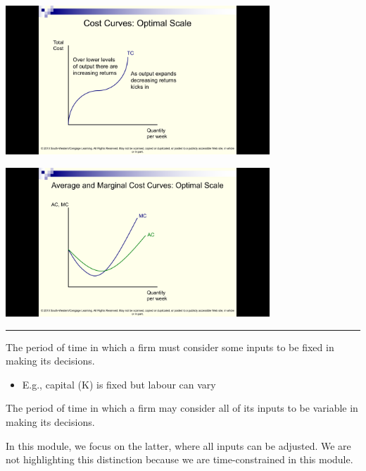 \documentclass[]{article}
\providecommand{\tightlist}{%
  \setlength{\itemsep}{0pt}\setlength{\parskip}{0pt}}
\begin{document}
\includegraphics[height=2.2in]{picsfigs/mesTCcurve.png}

\includegraphics[height=2.2in]{picsfigs/mescostcurves}

\begin{center}\rule{0.5\linewidth}{\linethickness}\end{center}

\begin{description}
\tightlist
\item[Short Run (SR)]
The period of time in which a firm must consider some inputs to be fixed
in making its decisions.
\end{description}

\begin{itemize}
\tightlist
\item
  E.g., capital (K) is fixed but labour can vary
\end{itemize}

\bigskip

\begin{description}
\tightlist
\item[Long Run (LR)]
The period of time in which a firm may consider all of its inputs to be
variable in making its decisions.
\end{description}

In this module, we focus on the latter, where all inputs can be
adjusted. We are not highlighting this distinction because we are
time-constrained in this module.\\
\end{document}
